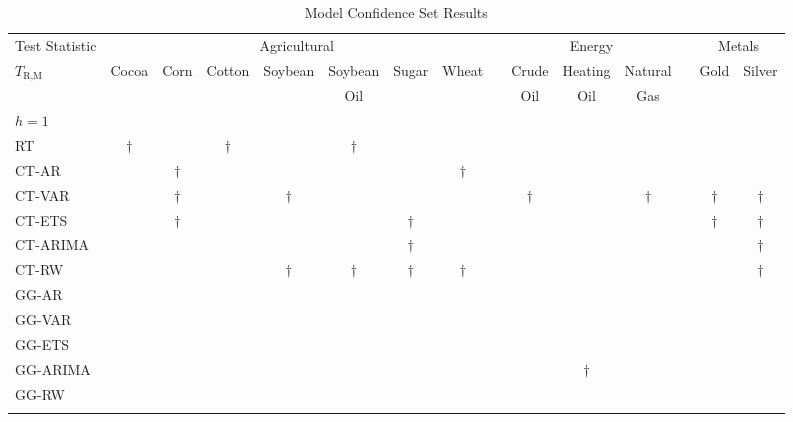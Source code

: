 \documentclass[12pt,a4paper]{article}
\providecommand{\tabularnewline}{\\}
\begin{document}
\begin{table}[!htbp]
\tabcolsep 0.043in
{\caption{Model Confidence Set Results}\label{tab:MCS_Results}
}{\footnotesize \par}
\begin{centering}
\begin{tabular}{@{}lcccccccccccccc@{}}
\toprule
{Test Statistic} & \multicolumn{7}{c}{{Agricultural}} &  & \multicolumn{3}{c}{{Energy}} &  & \multicolumn{2}{c}{{Metals}}\tabularnewline
\cline{2-8} \cline{10-12} \cline{14-15} 
{$T_{\text{R,M}}$} & {\footnotesize Cocoa} & {\footnotesize Corn} & {\footnotesize Cotton} & {\footnotesize Soybean} & {\footnotesize Soybean} & {\footnotesize Sugar} & {\footnotesize Wheat} &  & {\footnotesize Crude} & {\footnotesize Heating} & {\footnotesize Natural} &  & {\footnotesize Gold} & {\footnotesize Silver}\tabularnewline
& & & & & {\footnotesize Oil} & & &  & {\footnotesize Oil} & {\footnotesize Oil} & {\footnotesize Gas} \\
\midrule
{$h=1$} &  &  &  &  &  &  &  &  &  &  &   &  &  & \tabularnewline
RT       & $\dagger$ &   & $\dagger$ &   & $\dagger$ &   &   &   &   &   &   &   &   &    \\
CT-AR    &   & $\dagger$ &   &   &   &   & $\dagger$ &   &   &   &   &   &   &    \\
CT-VAR   &   & $\dagger$ &   & $\dagger$ &   &   &   &   & $\dagger$ &   & $\dagger$ &   & $\dagger$ & $\dagger$  \\
CT-ETS   &   & $\dagger$ &   &   &   & $\dagger$ &   &   &   &   &   &   & $\dagger$ & $\dagger$  \\
CT-ARIMA &   &   &   &   &   & $\dagger$ &   &   &   &   &   &   &   & $\dagger$  \\
CT-RW    &   &   &   & $\dagger$ & $\dagger$ & $\dagger$ & $\dagger$ &   &   &   &   &   &   & $\dagger$  \\
GG-AR    &   &   &   &   &   &   &   &   &   &   &   &   &   &    \\
GG-VAR   &   &   &   &   &   &   &   &   &   &   &   &   &   &    \\
GG-ETS   &   &   &   &   &   &   &   &   &   &   &   &   &   &    \\
GG-ARIMA &   &   &   &   &   &   &   &   &   & $\dagger$ &   &   &   &    \\
GG-RW    &   &   &   &   &   &   &   &   &   &   &   &   &   &                      \\
                   &            &            &            &            &            &             &            &  &             &            &            &                      &                      &                       \\

\end{tabular}
\end{centering}
\end{table}
\end{document}
